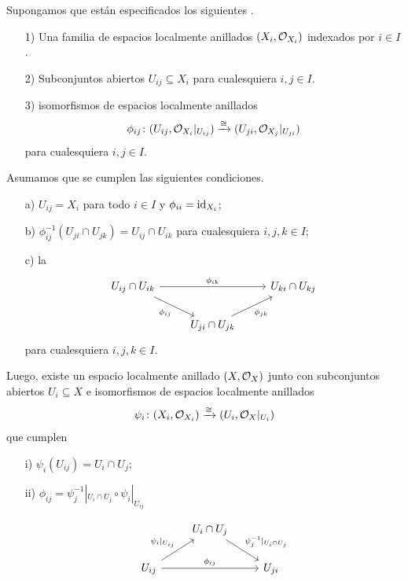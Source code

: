 \documentclass{article}
\numberwithin{equation}{section}
\theoremstyle{definition}
\begin{document}
\begin{teorema}
  \label{thm:pegamiento-de-ELA}
  Supongamos que están especificados los siguientes .

  \begin{enumerate}
  \item[1)] Una familia de espacios localmente anillados $(X_i, \mathcal{O}_{X_i})$
    indexados por $i \in I$.

  \item[2)] Subconjuntos abiertos $U_{ij} \subseteq X_i$ para cualesquiera
    $i,j \in I$.

  \item[3)] isomorfismos de espacios localmente anillados
    \[ \phi_{ij}\colon (U_{ij}, \mathcal{O}_{X_i}|_{U_{ij}}) \xrightarrow{\cong}
       (U_{ji}, \mathcal{O}_{X_j}|_{U_{ji}}) \]
    para cualesquiera $i,j \in I$.
  \end{enumerate}

  Asumamos que se cumplen las siguientes condiciones.
  \begin{enumerate}
  \item[a)] $U_{ij} = X_i$ para todo $i\in I$ y $\phi_{ii} = \mathrm{id}_{X_i}$;

  \item[b)] $\phi_{ij}^{-1} (U_{ji} \cap U_{jk}) = U_{ij} \cap U_{ik}$
    para cualesquiera $i,j,k \in I$;
  
  \item[c)] la 
    \[ \begin{tikzcd}
        U_{ij} \cap U_{ik} \ar{rr}{\phi_{ik}}\ar{dr}[swap]{\phi_{ij}} && U_{ki} \cap U_{kj} \\
        & U_{ji} \cap U_{jk}\ar{ur}[swap]{\phi_{jk}}
      \end{tikzcd} \]
    para cualesquiera $i,j,k \in I$.
  \end{enumerate}

  Luego, existe un espacio localmente anillado $(X, \mathcal{O}_X)$ junto con
  subconjuntos abiertos $U_i \subseteq X$ e isomorfismos de espacios localmente
  anillados
  $$\psi_i\colon (X_i, \mathcal{O}_{X_i}) \xrightarrow{\cong} (U_i, \mathcal{O}_X|_{U_i})$$
  que cumplen
  \begin{enumerate}
  \item[i)] $\psi_i (U_{ij}) = U_i \cap U_j$;
  \item[ii)] $\phi_{ij} = \psi_j^{-1}|_{U_i \cap U_j} \circ \psi_i|_{U_{ij}}$

    \[ \begin{tikzcd}
        & U_i \cap U_j\ar{dr}{\psi_j^{-1}|_{U_i \cap U_j}} \\
        U_{ij} \ar{rr}{\phi_{ij}}\ar{ur}{\psi_i|_{U_{ij}}} && U_{ji}
      \end{tikzcd} \]
  \end{enumerate}


\end{teorema}
\end{document}
